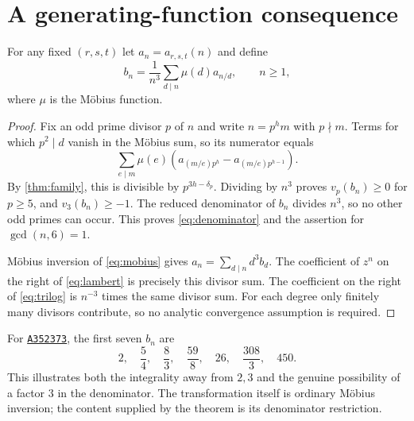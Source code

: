 \documentclass[11pt,a4paper]{article}
\numberwithin{equation}{section}
\theoremstyle{research}
\newtheorem{proposition}[theorem]{Proposition}
\theoremstyle{definition}
\newcommand{\Z}{\mathbb Z}
\newcommand{\Q}{\mathbb Q}
\newcommand{\Li}{\operatorname{Li}}
\newcommand{\oeis}[1]{\href{https://oeis.org/#1}{\texttt{#1}}}
\begin{document}
\section{A generating-function consequence}
\label{sec:generating}
For any fixed $(r,s,t)$ let $a_n=a_{r,s,t}(n)$ and define
\begin{equation}\label{eq:mobius}
 b_n=\frac1{n^3}\sum_{d\mid n}\mu(d)a_{n/d},\qquad n\ge1,
\end{equation}
where $\mu$ is the M\"obius function.

\begin{proof}
Fix an odd prime divisor $p$ of $n$ and write $n=p^h m$ with
$p\nmid m$. Terms for which $p^2\mid d$ vanish in the M\"obius sum,
so its numerator equals
\[
 \sum_{e\mid m}\mu(e)
 \left(a_{(m/e)p^h}-a_{(m/e)p^{h-1}}\right).
\]
By \cref{thm:family}, this is divisible by $p^{3h-\delta_p}$.
Dividing by $n^3$ proves $v_p(b_n)\ge0$ for $p\ge5$, and
$v_3(b_n)\ge-1$. The reduced denominator of $b_n$ divides $n^3$,
so no other odd primes can occur. This proves \eqref{eq:denominator}
and the assertion for $\gcd(n,6)=1$.

M\"obius inversion of \eqref{eq:mobius} gives
$a_n=\sum_{d\mid n}d^3b_d$. The coefficient of $z^n$ on the right of
\eqref{eq:lambert} is precisely this divisor sum. The coefficient on
the right of \eqref{eq:trilog} is $n^{-3}$ times the same divisor sum.
For each degree only finitely many divisors contribute, so no analytic
convergence assumption is required.
\end{proof}

For \oeis{A352373}, the first seven $b_n$ are
\[
 2,\quad \frac54,\quad\frac83,\quad\frac{59}{8},\quad26,
 \quad\frac{308}{3},\quad450.
\]
This illustrates both the integrality away from $2,3$ and the genuine
possibility of a factor $3$ in the denominator. The transformation itself
is ordinary M\"obius inversion; the content supplied by the theorem is
its denominator restriction.
\end{document}

